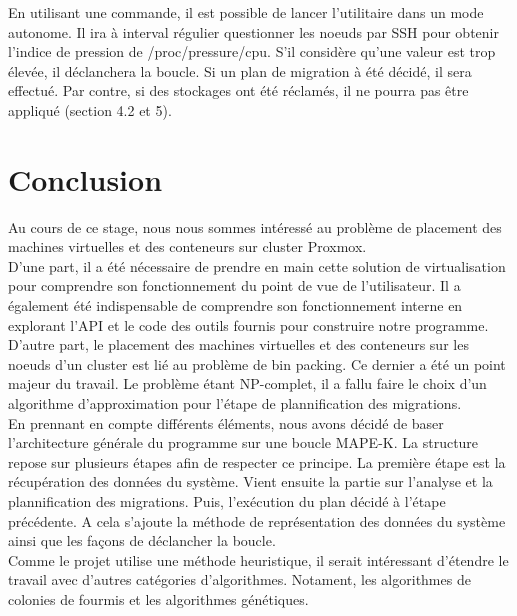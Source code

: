 \documentclass[14pt]{extarticle}
\begin{document}
    En utilisant une commande, il est possible de lancer l'utilitaire dans un mode autonome. Il ira à interval régulier questionner les noeuds par SSH pour obtenir l'indice de pression de /proc/pressure/cpu. S'il considère qu'une valeur est trop élevée, il déclanchera la boucle. Si un plan de migration à été décidé, il sera effectué. Par contre, si des stockages ont été réclamés, il ne pourra pas être appliqué (section 4.2 et 5).
    \newpage



\section*{Conclusion}
    Au cours de ce stage, nous nous sommes intéressé au problème de placement des machines virtuelles et des conteneurs sur cluster Proxmox.\\
    D'une part, il a été nécessaire de prendre en main cette solution de virtualisation pour comprendre son fonctionnement du point de vue de l'utilisateur. Il a également été indispensable de comprendre son fonctionnement interne en explorant l'API et le code des outils fournis pour construire notre programme.\\
    D'autre part, le placement des machines virtuelles et des conteneurs sur les noeuds d'un cluster est lié au problème de bin packing. Ce dernier a été un point majeur du travail. Le problème étant NP-complet, il a fallu faire le choix d'un algorithme d'approximation pour l'étape de plannification des migrations.\\
    En prennant en compte différents éléments, nous avons décidé de baser l'architecture générale du programme sur une boucle MAPE-K. La structure repose sur plusieurs étapes afin de respecter ce principe. La première étape est la récupération des données du système. Vient ensuite la partie sur l'analyse et la plannification des migrations. Puis, l'exécution du plan décidé à l'étape précédente. A cela s'ajoute la méthode de représentation des données du système ainsi que les façons de déclancher la boucle.\\
    Comme le projet utilise une méthode heuristique, il serait intéressant d'étendre le travail avec d'autres catégories d'algorithmes. Notament, les algorithmes de colonies de fourmis et les algorithmes génétiques.
\newpage



\printbibliography
\end{document}
